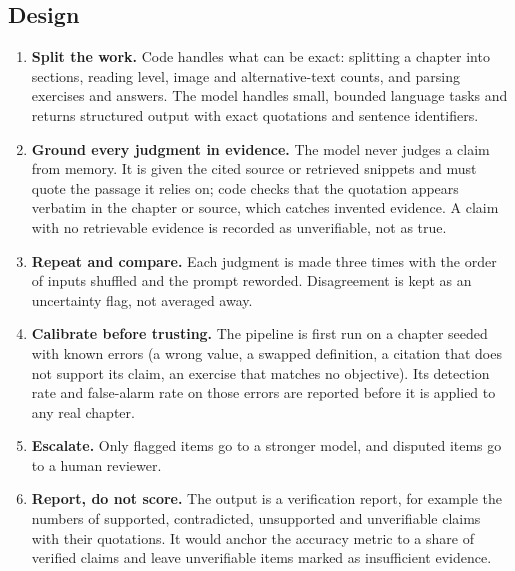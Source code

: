 \subsection{Design}
\begin{enumerate}[leftmargin=*,itemsep=2pt]
  \item \textbf{Split the work.} Code handles what can be exact: splitting a chapter into sections, reading level, image and alternative-text counts, and parsing exercises and answers. The model handles small, bounded language tasks and returns structured output with exact quotations and sentence identifiers.
  \item \textbf{Ground every judgment in evidence.} The model never judges a claim from memory. It is given the cited source or retrieved snippets and must quote the passage it relies on; code checks that the quotation appears verbatim in the chapter or source, which catches invented evidence. A claim with no retrievable evidence is recorded as unverifiable, not as true.
  \item \textbf{Repeat and compare.} Each judgment is made three times with the order of inputs shuffled and the prompt reworded. Disagreement is kept as an uncertainty flag, not averaged away.
  \item \textbf{Calibrate before trusting.} The pipeline is first run on a chapter seeded with known errors (a wrong value, a swapped definition, a citation that does not support its claim, an exercise that matches no objective). Its detection rate and false-alarm rate on those errors are reported before it is applied to any real chapter.
  \item \textbf{Escalate.} Only flagged items go to a stronger model, and disputed items go to a human reviewer.
  \item \textbf{Report, do not score.} The output is a verification report, for example the numbers of supported, contradicted, unsupported and unverifiable claims with their quotations. It would anchor the accuracy metric to a share of verified claims and leave unverifiable items marked as insufficient evidence.
\end{enumerate}

